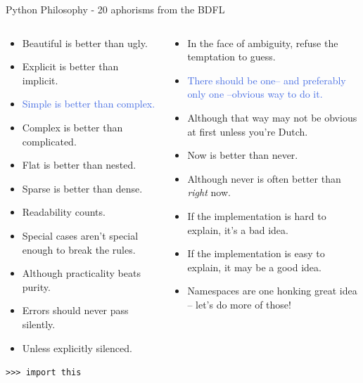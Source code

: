 \documentclass[11pt,professionalfonts,aspectratio=169,final]{beamer}
\def\Emph{\textcolor{RoyalBlue}}
\begin{document}
{\footnotesize
\begin{frame}{Python Philosophy - 20 aphorisms from the BDFL}

\begin{columns}[t]
\begin{column}{0.5\textwidth}
\begin{itemize}
    \item Beautiful is better than ugly.
    \item Explicit is better than implicit.
    \item \Emph{Simple is better than complex.}
    \item Complex is better than complicated.
    \item Flat is better than nested.
    \item Sparse is better than dense.
    \item Readability counts.
    \item Special cases aren't special enough to break the rules.
    \item Although practicality beats purity.
    \item Errors should never pass silently.
    \item Unless explicitly silenced.
\end{itemize}
\pause
\begin{block}{}
    \centering
    \texttt{>>> import this}
\end{block}
\end{column}
\begin{column}{0.5\textwidth}
    \begin{itemize}
        \item In the face of ambiguity, refuse the temptation to guess.
        \item \Emph{There should be one-- and preferably only one --obvious way to do it.}
        \item Although that way may not be obvious at first unless you're Dutch.
        \item Now is better than never.
        \item Although never is often better than \emph{right} now.
        \item If the implementation is hard to explain, it's a bad idea.
        \item If the implementation is easy to explain, it may be a good idea.
        \item Namespaces are one honking great idea -- let's do more of those!
    \end{itemize}
\end{column}
\end{columns}
\end{frame}
}
\end{document}
